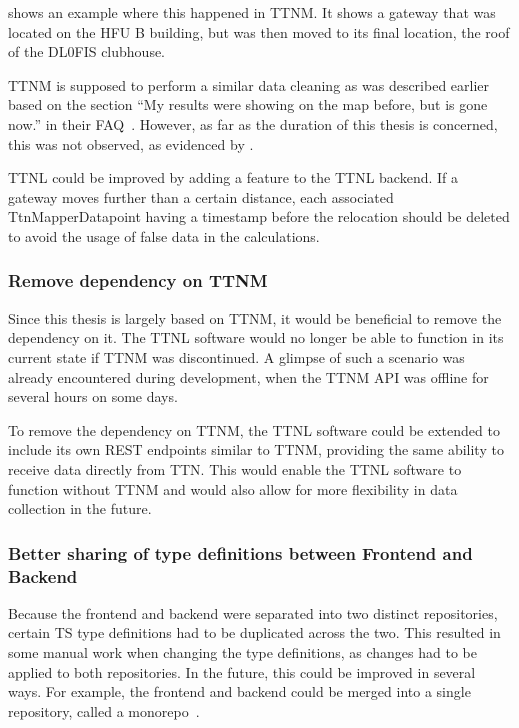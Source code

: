  shows an example where this happened in \ac{TTNM}.
It shows a gateway that was located on the \ac{HFU} B building, but was then moved to its final location, the roof of the DL0FIS clubhouse.

\ac{TTNM} is supposed to perform a similar data cleaning as was described earlier based on the section ``My results were showing on the map before, but is gone now.'' in their FAQ~\cite{ttn_mapper_faq_nodate}.
However, as far as the duration of this thesis is concerned, this was not observed, as evidenced by .

\ac{TTNL} could be improved by adding a feature to the \ac{TTNL} backend.
If a gateway moves further than a certain distance, each associated TtnMapperDatapoint having a timestamp before the relocation should be deleted to avoid the usage of false data in the calculations.

\subsubsection{Remove dependency on \acl{TTNM}}

Since this thesis is largely based on \ac{TTNM}, it would be beneficial to remove the dependency on it.
The \ac{TTNL} software would no longer be able to function in its current state if \ac{TTNM} was discontinued.
A glimpse of such a scenario was already encountered during development, when the \ac{TTNM} \ac{API} was offline for several hours on some days.

To remove the dependency on \ac{TTNM}, the \ac{TTNL} software could be extended to include its own \ac{REST} endpoints similar to \ac{TTNM}, providing the same ability to receive data directly from \ac{TTN}.
This would enable the \ac{TTNL} software to function without \ac{TTNM} and would also allow for more flexibility in data collection in the future.

\subsubsection{Better sharing of type definitions between Frontend and Backend}\label{subsubsec:outlook-sharing-type-definitions}

Because the frontend and backend were separated into two distinct repositories, certain \ac{TS} type definitions had to be duplicated across the two.
This resulted in some manual work when changing the type definitions, as changes had to be applied to both repositories.
In the future, this could be improved in several ways.
For example, the frontend and backend could be merged into a single repository, called a monorepo~\cite{narwhal_technologies_inc_monorepo_2022}.

